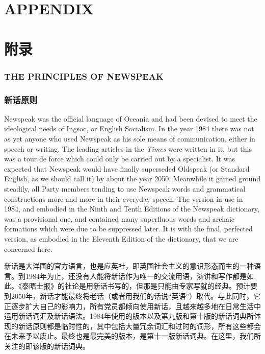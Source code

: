 \begin{paracol}{2}
\clearpage
\part{APPENDIX}\label{appendix}

\switchcolumn

\part*{附录}

\switchcolumn*

\section{THE PRINCIPLES OF NEWSPEAK}\label{the-principles-of-newspeak}

\switchcolumn

\section*{新话原则}\label{ux65b0ux8bddux539fux5219}

\switchcolumn*

Newspeak was the official language of Oceania and had been devised to
meet the ideological needs of Ingsoc, or English Socialism. In the year
1984 there was not as yet anyone who used Newspeak as his sole means of
communication, either in speech or writing. The leading articles in the
\emph{Times} were written in it, but this was a tour de force which
could only be carried out by a specialist. It was expected that Newspeak
would have finally superseded Oldspeak (or Standard English, as we
should call it) by about the year 2050. Meanwhile it gained ground
steadily, all Party members tending to use Newspeak words and
grammatical constructions more and more in their everyday speech. The
version in use in 1984, and embodied in the Ninth and Tenth Editions of
the Newspeak dictionary, was a provisional one, and contained many
superfluous words and archaic formations which were due to be suppressed
later. It is with the final, perfected version, as embodied in the
Eleventh Edition of the dictionary, that we are concerned here.

\switchcolumn

新话是大洋国的官方语言，也是应英社，即英国社会主义的意识形态而生的一种语言。到1984年为止，还没有人能将新话作为唯一的交流用语，演讲和写作都是如此。《泰晤士报》的社论是用新话书写的，但那是只能由专家写就的经典。预计要到2050年，新话才能最终将老话（或者用我们的话说``英语''）取代。与此同时，它正逐步扩大自己的影响力，所有党员都倾向使用新话，且越来越多地在日常生活中运用新话词汇及新话语法。1984年使用的版本以及第九版和第十版的新话词典所体现的新话原则都是临时性的，其中包括大量冗余词汇和过时的词形，所有这些都会在未来予以废止。最终也是最完美的版本，是第十一版新话词典。在这里，我们所关注的即该版的新话词典。


\end{paracol}
